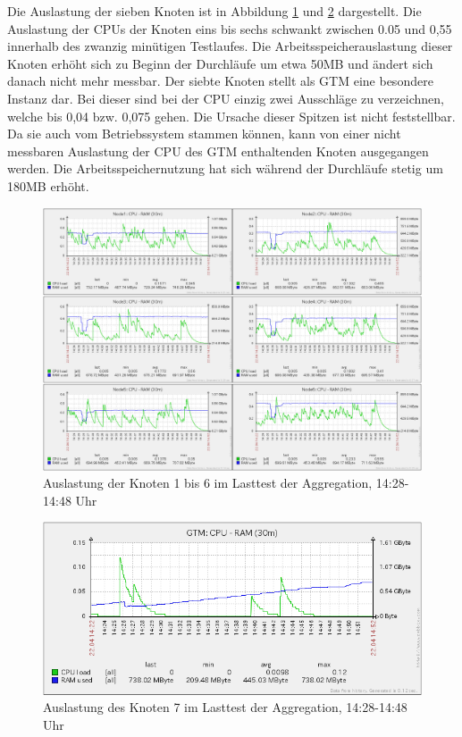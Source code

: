 Die Auslastung der sieben Knoten ist in Abbildung \ref{fig:auslastungTest1} und \ref{fig:auslastungTest1_gtm} dargestellt.
Die Auslastung der CPUs der Knoten eins bis sechs schwankt zwischen 0.05 und 0,55 innerhalb des zwanzig minütigen Testlaufes.
Die Arbeitsspeicherauslastung dieser Knoten erhöht sich zu Beginn der Durchläufe um etwa 50MB und ändert sich danach nicht mehr messbar.
Der siebte Knoten stellt als GTM eine besondere Instanz dar.
Bei dieser sind bei der CPU einzig zwei Ausschläge zu verzeichnen, welche bis 0,04 bzw. 0,075 gehen.
Die Ursache dieser Spitzen ist nicht feststellbar.
Da sie auch vom Betriebssystem stammen können, kann von einer nicht messbaren Auslastung der CPU des GTM enthaltenden Knoten ausgegangen werden.
Die Arbeitsspeichernutzung hat sich während der Durchläufe stetig um 180MB erhöht.
\begin{figure}[h!]
\centering
\includegraphics[width=\textwidth]{Testergebnisse/jdbc_aggregation_Testlauf.png}
\caption[Auslastung der Knoten 1 bis 6 im Lasttest der Aggregation]{Auslastung der Knoten 1 bis 6 im Lasttest der Aggregation, 14:28-14:48 Uhr}
\label{fig:auslastungTest1}
\end{figure}
\begin{figure}[h!]
\centering
\includegraphics[width=.5\textwidth]{Testergebnisse/jdbc_aggregation_Testlauf_bild2.png}
\caption[Auslastung des Knoten 7 im Lasttest der Aggregation]{Auslastung des Knoten 7 im Lasttest der Aggregation, 14:28-14:48 Uhr}
\label{fig:auslastungTest1_gtm}
\end{figure}


